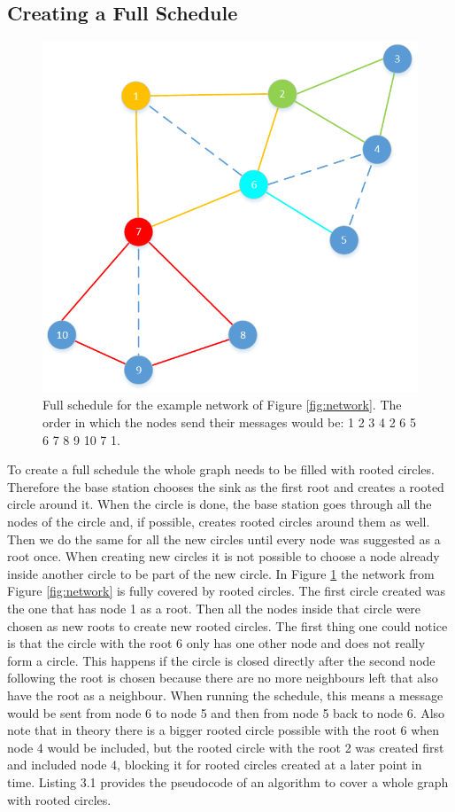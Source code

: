 \subsection{Creating a Full Schedule}
\begin{figure}[htbp]
	\centering         
    \includegraphics[scale=0.6]{content/images/Schedule/FullSchedule}
    \caption{Full schedule for the example network of Figure \ref{fig:network}. The order in which the nodes send their messages would be: 1 2 3 4 2 6 5 6 7 8 9 10 7 1.}
    \label{fig:schedule}
\end{figure} 
To create a full schedule the whole graph needs to be filled with rooted circles. Therefore the base station chooses the sink as the first root and creates a rooted circle around it. When the circle is done, the base station goes through all the nodes of the circle and, if possible, creates rooted circles around them as well. Then we do the same for all the new circles until every node was suggested as a root once. When creating new circles it is not possible to choose a node already inside another circle to be part of the new circle. In Figure \ref{fig:schedule} the network from Figure \ref{fig:network} is fully covered by rooted circles. The first circle created was the one that has node 1 as a root. Then all the nodes inside that circle were chosen as new roots to create new rooted circles. The first thing one could notice is that the circle with the root 6 only has one other node and does not really form a circle. This happens if the circle is closed directly after the second node following the root is chosen because there are no more neighbours left that also have the root as a neighbour. When running the schedule, this means a message would be sent from node 6 to node 5 and then from node 5 back to node 6. Also note that in theory there is a bigger rooted circle possible with the root 6 when node 4 would be included, but the rooted circle with the root 2 was created first and included node 4, blocking it for rooted circles created at a later point in time. Listing 3.1 provides the pseudocode of an algorithm to cover a whole graph with rooted circles.

